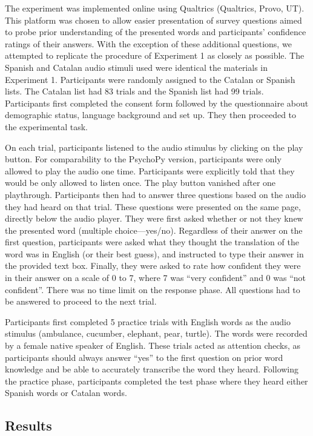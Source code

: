 \documentclass[
]{article}
\begin{document}
The experiment was implemented online using Qualtrics (Qualtrics, Provo,
UT). This platform was chosen to allow easier presentation of survey
questions aimed to probe prior understanding of the presented words and
participants' confidence ratings of their answers. With the exception of
these additional questions, we attempted to replicate the procedure of
Experiment 1 as closely as possible. The Spanish and Catalan audio
stimuli used were identical the materials in Experiment 1. Participants
were randomly assigned to the Catalan or Spanish lists. The Catalan list
had 83 trials and the Spanish list had 99 trials. Participants first
completed the consent form followed by the questionnaire about
demographic status, language background and set up. They then proceeded
to the experimental task.

On each trial, participants listened to the audio stimulus by clicking
on the play button. For comparability to the PsychoPy version,
participants were only allowed to play the audio one time. Participants
were explicitly told that they would be only allowed to listen once. The
play button vanished after one playthrough. Participants then had to
answer three questions based on the audio they had heard on that trial.
These questions were presented on the same page, directly below the
audio player. They were first asked whether or not they knew the
presented word (multiple choice---yes/no). Regardless of their answer on
the first question, participants were asked what they thought the
translation of the word was in English (or their best guess), and
instructed to type their answer in the provided text box. Finally, they
were asked to rate how confident they were in their answer on a scale of
0 to 7, where 7 was ``very confident'' and 0 was ``not confident''.
There was no time limit on the response phase. All questions had to be
answered to proceed to the next trial.

Participants first completed 5 practice trials with English words as the
audio stimulus (ambulance, cucumber, elephant, pear, turtle). The words
were recorded by a female native speaker of English. These trials acted
as attention checks, as participants should always answer ``yes'' to the
first question on prior word knowledge and be able to accurately
transcribe the word they heard. Following the practice phase,
participants completed the test phase where they heard either Spanish
words or Catalan words.

\subsection{Results}\label{results-2}
\end{document}
